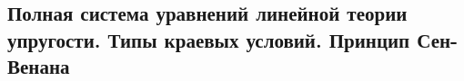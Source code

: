 

\subsection{Полная система уравнений линейной теории упругости. Типы краевых условий. Принцип Сен-Венана}



